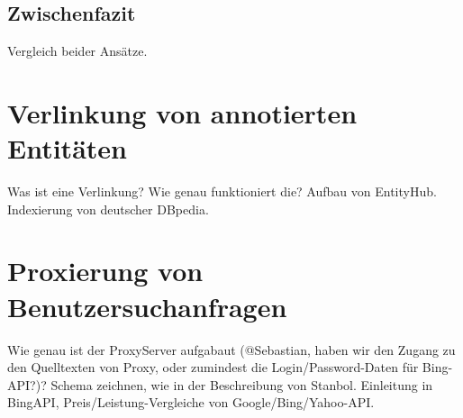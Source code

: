 \subsection{Zwischenfazit}
Vergleich beider Ansätze.

\section{Verlinkung von annotierten Entitäten}
Was ist eine Verlinkung? Wie genau funktioniert die? Aufbau von EntityHub. Indexierung von deutscher DBpedia.

\section{Proxierung von Benutzersuchanfragen}
Wie genau ist der ProxyServer aufgabaut (@Sebastian, haben wir den Zugang zu den Quelltexten von Proxy, oder zumindest die Login/Password-Daten für Bing-API?)? Schema zeichnen, wie in der Beschreibung von Stanbol. Einleitung in BingAPI, Preis/Leistung-Vergleiche von Google/Bing/Yahoo-API.